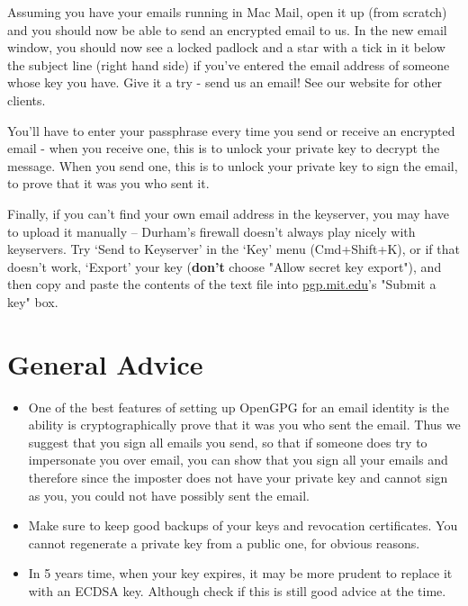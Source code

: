 \begin{compactenum}[1.]
  \item Assuming you have your emails running in Mac Mail, open it up (from scratch) and you should now be able to send an encrypted email to us. In the new email window, you should now see a locked padlock and a star with a tick in it below the subject line (right hand side) if you've entered the email address of someone whose key you have. Give it a try - send us an email! See our website for other clients.
  \item You'll have to enter your passphrase every time you send or receive an encrypted email - when you receive one, this is to unlock your private key to decrypt the message. When you send one, this is to unlock your private key to sign the email, to prove that it was you who sent it.
    \item Finally, if you can't find your own email address in the keyserver, you may have to upload it manually -- Durham's firewall doesn't always play nicely with keyservers. Try `Send to Keyserver' in the `Key' menu (Cmd+Shift+K), or if that doesn't work, `Export' your key (\textbf{don't} choose "Allow secret key export"), and then copy and paste the contents of the text file into \href{http://pgp.mit.edu}{pgp.mit.edu}'s "Submit a key" box.
\end{compactenum}%

\section{General Advice}

\begin{itemize}
    \item One of the best features of setting up OpenGPG for an email identity is the ability is cryptographically prove that it was you who sent the email. Thus we suggest that you sign all emails you send, so that if someone does try to impersonate you over email, you can show that you sign all your emails and therefore since the imposter does not have your private key and cannot sign as you, you could not have possibly sent the email.
    \item Make sure to keep good backups of your keys and revocation certificates. You cannot regenerate a private key from a public one, for obvious reasons.
    \item In 5 years time, when your key expires, it may be more prudent to replace it with an ECDSA key. Although check if this is still good advice at the time.
\end{itemize}

